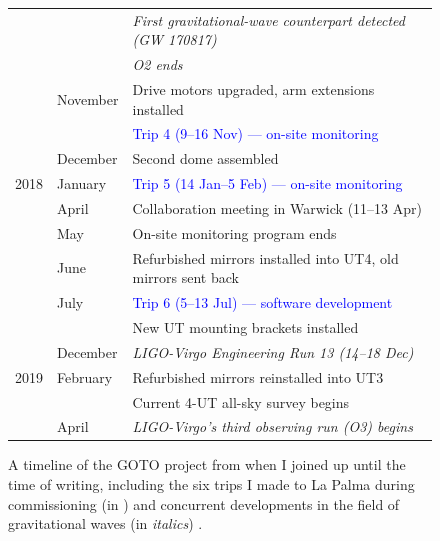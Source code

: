 \begin{colsection}
\begin{figure}[p]
\begin{center}
\begin{tabular}{cl|@{\tls}l}
                 &           & \textit{First gravitational-wave counterpart detected (GW 170817)} \\
                 &           & \textit{O2 ends} \\
                 & November  & Drive motors upgraded, arm extensions installed \\
                 &           & \textcolor{Blue}{Trip 4 (9--16 Nov) --- on-site monitoring} \\
                 & December  & Second dome assembled \\
            \midrule
            2018 & January   & \textcolor{Blue}{Trip 5 (14 Jan--5 Feb) --- on-site monitoring} \\
                 & April     & Collaboration meeting in Warwick (11--13 Apr)\\
                 & May       & On-site monitoring program ends \\
                 & June      & Refurbished mirrors installed into UT4, old mirrors sent back \\
                 & July      & \textcolor{Blue}{Trip 6 (5--13 Jul) --- software development} \\
                 &           & New UT mounting brackets installed \\
                 & December  & \textit{LIGO-Virgo Engineering Run 13 (14--18 Dec)} \\
            \midrule
            2019 & February  & Refurbished mirrors reinstalled into UT3 \\
                 &           & Current 4-UT all-sky survey begins \\
                 & April     & \textit{LIGO-Virgo's third observing run (O3) begins} \\
        \end{tabular}
    \end{center}
    \caption[Timeline of the GOTO project]{
        A timeline of the GOTO project from when I joined up until the time of writing, including the six trips I made to La Palma during commissioning (in ) and concurrent developments in the field of gravitational waves (in \textit{italics}) .
    }\label{tab:timeline}
\end{figure}

\clearpage


\end{colsection}
